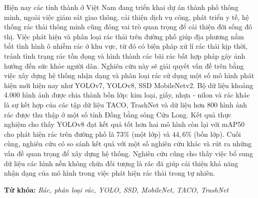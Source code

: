\documentclass[./thesis.tex]{subfiles}
\begin{document}

{\fontsize{13}{12} \selectfont

Hiện nay các tỉnh thành ở Việt Nam đang triển khai dự án thành phố thông minh, ngoài việc giám sát giao thông, cải thiện dịch vụ công, phát triển y tế, hệ thống rác thải thông minh cũng đóng vai trò quan trọng để cải thiện đời sống đô thị.
Việc phát hiện và phân loại rác thải trên đường phố giúp địa phương nắm bắt tình hình ô nhiễm rác ở khu vực, từ đó có biện pháp xử lí rác thải kịp thời, tránh tình trạng rác tồn đọng và hình thành các bãi rác bất hợp pháp gây ảnh hưởng đến sức khỏe người dân.
Nghiên cứu này sẽ giải quyết vấn đề trên bằng việc xây dựng hệ thống nhận dạng và phân loại rác sử dụng một số mô hình phát hiện mới hiện nay như YOLOv7, YOLOv8, SSD MobileNetv2.
Bộ dữ liệu khoảng 4.000 hình ảnh được chia thành bốn lớp: kim loại, giấy, nhựa - nilon và rác khác là sự kết hợp của các tập dữ liệu TACO, TrashNet và dữ liệu hơn 800 hình ảnh rác được thu thập ở một số tỉnh Đồng bằng sông Cửu Long.
Kết quả thực nghiệm cho thấy YOLOv8 đạt kết quả tốt hơn hai mô hình còn lại với mAP50 cho phát hiện rác trên đường phố là $73\%$ (một lớp) và $44,6\%$ (bốn lớp).
Cuối cùng, nghiên cứu có so sánh kết quả với một số nghiên cứu khác và rút ra những vấn đề quan trọng để xây dựng hệ thống.
Nghiên cứu cũng cho thấy việc bổ sung dữ liệu các hình nền không chứa đối tượng là rác đã giúp cải thiện khả năng nhận dạng của mô hình trong việc phát hiện rác thải trong tự nhiên.

}

{\bf Từ khóa:} \textit{Rác, phân loại rác, YOLO, SSD, MobileNet, TACO, TrashNet}
\end{document}
